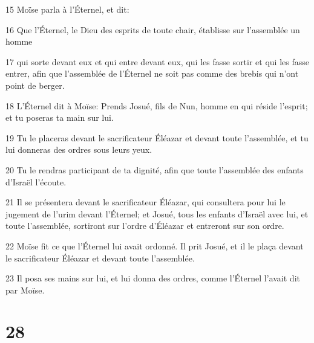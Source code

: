 \par 15 Moïse parla à l'Éternel, et dit:
\par 16 Que l'Éternel, le Dieu des esprits de toute chair, établisse sur l'assemblée un homme
\par 17 qui sorte devant eux et qui entre devant eux, qui les fasse sortir et qui les fasse entrer, afin que l'assemblée de l'Éternel ne soit pas comme des brebis qui n'ont point de berger.
\par 18 L'Éternel dit à Moïse: Prends Josué, fils de Nun, homme en qui réside l'esprit; et tu poseras ta main sur lui.
\par 19 Tu le placeras devant le sacrificateur Éléazar et devant toute l'assemblée, et tu lui donneras des ordres sous leurs yeux.
\par 20 Tu le rendras participant de ta dignité, afin que toute l'assemblée des enfants d'Israël l'écoute.
\par 21 Il se présentera devant le sacrificateur Éléazar, qui consultera pour lui le jugement de l'urim devant l'Éternel; et Josué, tous les enfants d'Israël avec lui, et toute l'assemblée, sortiront sur l'ordre d'Éléazar et entreront sur son ordre.
\par 22 Moïse fit ce que l'Éternel lui avait ordonné. Il prit Josué, et il le plaça devant le sacrificateur Éléazar et devant toute l'assemblée.
\par 23 Il posa ses mains sur lui, et lui donna des ordres, comme l'Éternel l'avait dit par Moïse.

\chapter{28}

